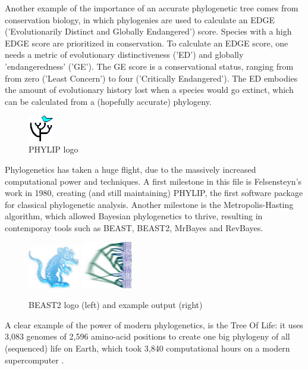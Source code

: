 Another example of the importance of an accurate phylogenetic tree 
comes from conservation biology, in which phylogenies are used to
calculate an EDGE ('Evolutionarily Distinct and Globally Endangered') 
score. Species with a high EDGE score are prioritized in conservation.
To calculate an EDGE score, one needs a metric of evolutionary 
distinctiveness ('ED') and globally 'endangeredness' ('GE').
The GE score is a conservational status, ranging from from zero ('Least Concern') 
to four ('Critically Endangered'). 
The ED embodies the amount of evolutionary history lost when a species 
would go extinct, which can be calculated from a (hopefully accurate) 
phylogeny.

\begin{figure}[H]
  \includegraphics[width=0.1\textwidth]{phylip.png}
  \caption{
    PHYLIP logo
 }
  \label{fig:phylip}
\end{figure}

Phylogenetics has taken a huge flight, due to the massively increased
computational power and techniques. A first milestone in this file is 
Felsensteyn's work in 1980, creating (and still maintaining) PHYLIP, 
the first software package for classical phylogenetic analysis.
Another milestone is the Metropolis-Hasting algorithm, which 
allowed Bayesian phylogenetics to thrive, resulting in
contemporay tools such as BEAST, BEAST2, MrBayes and RevBayes.

\begin{figure}[H]
  \includegraphics[width=0.2\textwidth]{beast_logo.png}
  \includegraphics[width=0.2\textwidth]{DensiTreeExample2.jpg}
  \caption{
    BEAST2 logo (left) and example output (right)
 }
  \label{fig:beast2}
\end{figure}

A clear example of the power of modern phylogenetics,
is the Tree Of Life: it uses 
3,083 genomes of 2,596 amino-acid positions 
to create one big phylogeny of all (sequenced) life on Earth,
which took 3,840 computational hours on a modern supercomputer \cite{hug2016new}.


